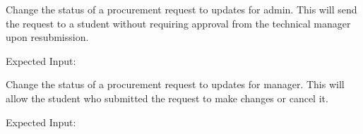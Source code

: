 \documentclass[letterpaper,10pt,english]{sphinxmanual}
\begin{document}
\begin{fulllineitems}
\begin{fulllineitems}
\begin{quote}
\begin{description}
\end{description}\end{quote}

\end{fulllineitems}


\begin{fulllineitems}
\label{\detokenize{apidoc/utdesign_procurement:utdesign_procurement.apigateway.ApiGateway.procurementUpdateAdmin}}
Change the status of a procurement request to updates for admin.
This will send the request to a student without requiring approval
from the technical manager upon resubmission.

Expected Input:

\begin{sphinxVerbatim}[commandchars=\\\{\}]
     
     
\end{sphinxVerbatim}

\end{fulllineitems}


\begin{fulllineitems}
\label{\detokenize{apidoc/utdesign_procurement:utdesign_procurement.apigateway.ApiGateway.procurementUpdateManager}}
Change the status of a procurement request to updates for manager.
This will allow the student who submitted the request to make changes
or cancel it.

Expected Input:

\begin{sphinxVerbatim}[commandchars=\\\{\}]
     
     
\end{sphinxVerbatim}


\end{fulllineitems}
\end{fulllineitems}
\end{document}
